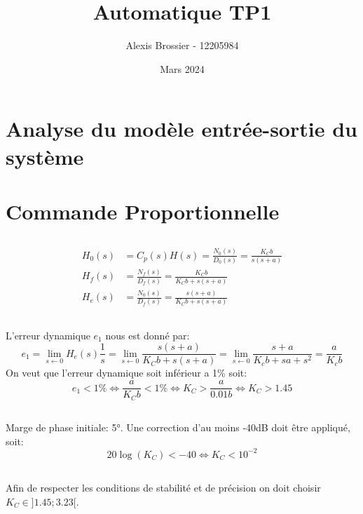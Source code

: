 \documentclass{article}
\title{Automatique TP1}
\author{Alexis Brossier - 12205984}
\date{Mars 2024}
\begin{document}
\maketitle

\section{Analyse du modèle entrée-sortie du système}
\section{Commande Proportionnelle}
\subsection{}
\begin{align}
    H_0(s)&=C_p(s)H(s)=\frac{N_0(s)}{D_0(s)}=\frac{K_Cb}{s(s+a)}\\
    H_f(s)&=\frac{N_f(s)}{D_f(s)}=\frac{K_Cb}{K_Cb+s(s+a)}\\
    H_e(s)&=\frac{N_0(s)}{D_f(s)}=\frac{s(s+a)}{K_Cb+s(s+a)}
\end{align}
\subsection{}
L'erreur dynamique $e_1$ nous est donné par:
\begin{equation}
    e_1=\lim_{s\leftarrow0}H_e(s)\frac{1}{s}=\lim_{s\leftarrow0}\frac{s(s+a)}{K_Cb+s(s+a)}=\lim_{s\leftarrow0}\frac{s+a}{K_cb+sa+s^2}=\frac{a}{K_cb}
\end{equation}
On veut que l'erreur dynamique soit inférieur a 1\% soit:
\begin{equation*}
    e_1<1\%\Leftrightarrow\frac{a}{K_Cb}<1\%\Leftrightarrow K_C>\frac{a}{0.01b}\Leftrightarrow K_C>1.45
\end{equation*}
\subsection{}
\subsection{}
Marge de phase initiale: 5°. Une correction d'au moins -40dB doit être appliqué, soit:
$$
    20\log(K_C)<-40\Leftrightarrow K_C<10^{-2}
$$
\subsection{}
Afin de respecter les conditions de stabilité et de précision on doit choisir $K_C\in]1.45;3.23[$.
\end{document}
